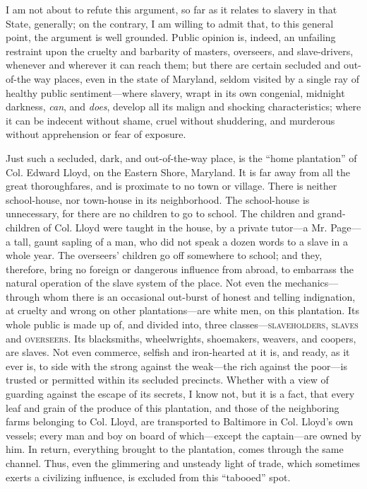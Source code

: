 I am not about to refute this argument, so far as it relates to slavery
in that State, generally; on the contrary, I am willing to admit that,
to this general point, the argument is well grounded. Public opinion is,
indeed, an unfailing restraint upon the cruelty and barbarity of
masters, overseers, and slave-drivers, whenever and wherever it can
reach them; but there {\protect\hypertarget{62}{}{}}are certain secluded
and out-of-the way places, even in the state of Maryland, seldom visited
by a single ray of healthy public sentiment---where slavery, wrapt in
its own congenial, midnight darkness, \emph{can}, and \emph{does},
develop all its malign and shocking characteristics; where it can be
indecent without shame, cruel without shuddering, and murderous without
apprehension or fear of exposure.

Just such a secluded, dark, and out-of-the-way place, is the ``home
plantation'' of Col. Edward Lloyd, on the Eastern Shore, Maryland. It is
far away from all the great thoroughfares, and is proximate to no town
or village. There is neither school-house, nor town-house in its
neighborhood. The school-house is unnecessary, for there are no children
to go to school. The children and grand-children of Col. Lloyd were
taught in the house, by a private tutor---a Mr. Page---a tall, gaunt
sapling of a man, who did not speak a dozen words to a slave in a whole
year. The overseers' children go off somewhere to school; and they,
therefore, bring no foreign or dangerous influence from abroad, to
embarrass the natural operation of the slave system of the place. Not
even the mechanics---through whom there is an occasional out-burst of
honest and telling indignation, at cruelty and wrong on other
plantations---are white men, on this plantation. Its whole public is
made up of, and divided into, three classes---\textsc{slaveholders},
\textsc{slaves} and \textsc{overseers}. Its blacksmiths, wheelwrights,
shoemakers, weavers, and coopers, are slaves. Not even commerce, selfish
and iron-hearted at it is, and ready, as it ever is, to side with the
strong against the {\protect\hypertarget{63}{}{}}weak---the rich against
the poor---is trusted or permitted within its secluded precincts.
Whether with a view of guarding against the escape of its secrets, I
know not, but it is a fact, that every leaf and grain of the produce of
this plantation, and those of the neighboring farms belonging to Col.
Lloyd, are transported to Baltimore in Col. Lloyd's own vessels; every
man and boy on board of which---except the captain---are owned by him.
In return, everything brought to the plantation, comes through the same
channel. Thus, even the glimmering and unsteady light of trade, which
sometimes exerts a civilizing influence, is excluded from this
``tabooed'' spot.

